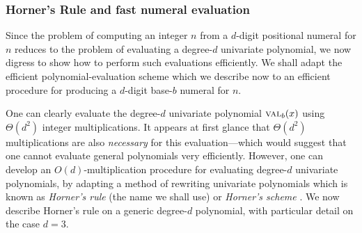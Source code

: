 \subsubsection{Horner's Rule and fast numeral evaluation}
\label{sec:Horner-fast-evaluation}

Since the problem of computing an integer $n$ from a $d$-digit positional numeral for $n$ reduces to the problem of evaluating a degree-$d$ univariate polynomial, we now digress to show how to perform such evaluations efficiently.  We shall adapt the efficient polynomial-evaluation scheme which we describe now to an efficient procedure for producing a $d$-digit base-$b$ numeral for $n$.

\medskip

 
 

One can clearly evaluate the degree-$d$ univariate polynomial $\mbox{\sc val}_{b}(x)$ using $\Theta(d^2)$ integer multiplications.  It appears at first glance that $\Theta(d^2)$ multiplications are also {\em necessary} for this evaluation---which would suggest that one cannot evaluate general polynomials very efficiently.  However, one can develop an $O(d)$-multiplication procedure for evaluating degree-$d$ univariate polynomials, by adapting a method of rewriting univariate polynomials which is known as {\it Horner's rule} (the name we shall use) or {\it Horner's scheme} \cite{Horner}.  We now describe Horner's rule on a generic degree-$d$ polynomial, with particular detail on the case $d=3$.

\bigskip

\noindent {}

\bigskip

